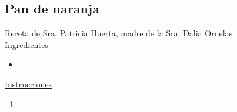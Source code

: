\subsection{Pan de naranja}

Receta de Sra. Patricia Huerta, madre de la Sra. Dalia Ornelas\\

\underline{Ingredientes} 
\begin{itemize}
\item 
\end{itemize}

\underline{Instrucciones}
\begin{enumerate}
\item 
\end{enumerate}